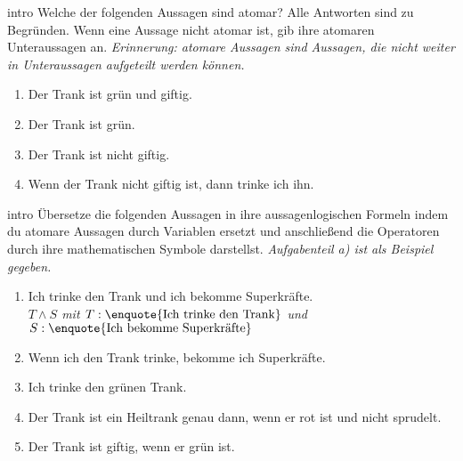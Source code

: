 \documentclass[../aussagenlogik.tex]{subfiles}
\begin{document}
\begin{exercise}{intro}
    Welche der folgenden Aussagen sind atomar? Alle Antworten sind zu Begründen. Wenn eine Aussage nicht atomar ist, gib ihre atomaren Unteraussagen an. \emph{Erinnerung: atomare Aussagen sind Aussagen, die nicht weiter in Unteraussagen aufgeteilt werden können.}
    \begin{enumerate}
        \item Der Trank ist grün und giftig.
        \item Der Trank ist grün.
        \item Der Trank ist nicht giftig.
        \item Wenn der Trank nicht giftig ist, dann trinke ich ihn.
    \end{enumerate}
\end{exercise}

\begin{exercise}{intro}
    Übersetze die folgenden Aussagen in ihre aussagenlogischen Formeln indem du atomare Aussagen durch Variablen ersetzt und anschließend die Operatoren durch ihre mathematischen Symbole darstellst. \emph{Aufgabenteil a) ist als Beispiel gegeben.}
    \begin{enumerate}
        \item Ich trinke den Trank und ich bekomme Superkräfte.\\
        \textit{$T \land S$ mit $T: \text{\enquote{Ich trinke den Trank}}$ und $S: \text{\enquote{Ich bekomme Superkräfte}}$}
        \item Wenn ich den Trank trinke, bekomme ich Superkräfte.
        \item Ich trinke den grünen Trank.
        \item Der Trank ist ein Heiltrank genau dann, wenn er rot ist und nicht sprudelt.
        \item Der Trank ist giftig, wenn er grün ist.
    \end{enumerate}
\end{exercise}

\end{document}
